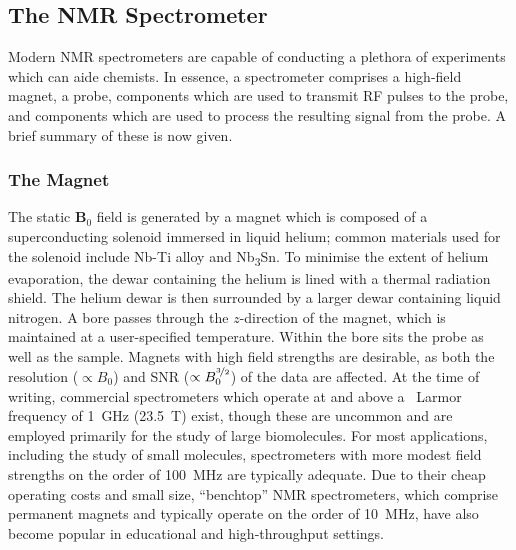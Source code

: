 \subsection{The NMR Spectrometer}

Modern \ac{NMR} spectrometers are capable of conducting a plethora of
experiments which can aide chemists.
In essence, a spectrometer comprises a high-field magnet, a probe, components
which are used to transmit \ac{RF} pulses to the probe, and components which
are used to process the resulting signal from the probe. A brief summary of
these is now given.

\subsubsection{The Magnet}
The static $\symbf{B}_0$ field is generated by a magnet which is composed of a
superconducting solenoid immersed in liquid helium; common materials used for
the solenoid include Nb-Ti alloy and Nb\textsubscript{3}Sn. To minimise the
extent of helium evaporation, the dewar containing the helium is lined with
a thermal radiation shield. The helium dewar is then surrounded by a larger
dewar containing liquid nitrogen. A bore passes through the $z$-direction of
the magnet, which is maintained at a user-specified temperature. Within the
bore sits the probe as well as the sample. Magnets with high field
strengths are desirable, as both the resolution ($\propto B_0$) and \ac{SNR}
($\propto B_0^{\nicefrac{3}{2}}$) of the data are affected. At the
time of writing, commercial spectrometers which operate at and above a
\proton\ Larmor frequency of \qty{1}{\giga\hertz} (\qty{23.5}{\tesla}) exist,
though these are uncommon and are employed primarily for the study of large
biomolecules. For most applications, including the study of small molecules,
spectrometers with more modest field strengths on the order of
\qty{100}{\mega\hertz} are typically adequate. Due to their cheap operating
costs and small size, ``benchtop'' \ac{NMR} spectrometers, which
comprise permanent magnets and typically operate on the order of
\qty{10}{\mega\hertz}, have also become popular in educational and
high-throughput settings\cite{Giberson2021}.

